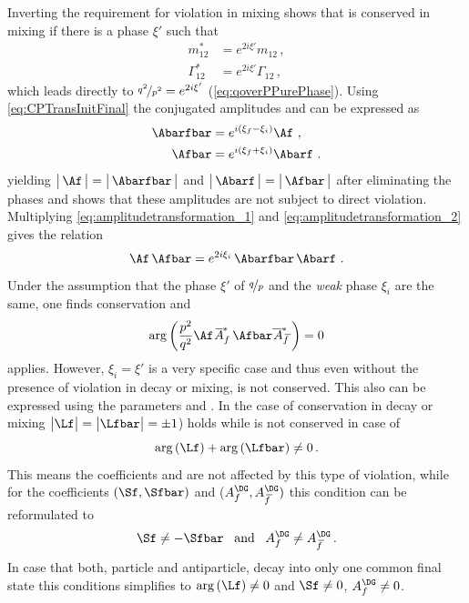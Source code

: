 Inverting the requirement for \CP violation in mixing shows that \CP is conserved in mixing if there is a phase $\xi'$ such that
\begin{equation}
\begin{split}
m_{12}^\ast &= e^{2i\xi'}m_{12}\,,\\
\Gamma_{12}^\ast &= e^{2i\xi'}\Gamma_{12}\,,\label{eq:CPconservationMixing}
\end{split}
\end{equation}
which leads directly to $\nicefrac{q^2}{p^2} = e^{2i\xi'}$ (\cref{eq:qoverPPurePhase}).
Using \cref{eq:CPTransInitFinal} the \CP conjugated amplitudes \Abarfbar and \Afbar can be expressed as
\begin{align}
\Abarfbar&=e^{i\left(\xi_f-\xi_i\right)}\Af\,\,,\label{eq:amplitudetransformation_1}\\
\Afbar&=e^{i\left(\xi_f+\xi_i\right)}\Abarf\,\,.\label{eq:amplitudetransformation_2}
\end{align}
yielding $\big|\,\Af\,\big|=\big|\,\Abarfbar\,\big|$ and $\big|\,\Abarf\,\big|=\big|\,\Afbar\,\big|$ after eliminating the phases and shows that these amplitudes are not subject to direct \CP violation.
Multiplying \cref{eq:amplitudetransformation_1} and \cref{eq:amplitudetransformation_2} gives the relation
\begin{equation}
\Af\,\Afbar=e^{2i\xi_i}\,\Abarfbar\,\Abarf\,\,.
\end{equation}
Under the assumption that the phase $\xi'$ of $\nicefrac{q}{p}$ and the \emph{weak} phase $\xi_i$ are the same, one finds \CP conservation and
\begin{equation}
\arg\left(\frac{p^2}{q^2}\Af \,\overline{\kern -1.0pt A\kern -1.0pt}_{\kern 1.0pt f}^\ast\,\Afbar\overline{\kern -1.0pt \,A\kern -1.0pt}_{\kern 2.5pt\overline{\kern -1.5pt f\kern 1.5pt}}^\ast\right)=0
\end{equation}
applies.
However, $\xi_i=\xi'$ is a very specific case and thus even without the presence of \CP violation in decay or mixing, \CP is not conserved.
This also can be expressed using the parameters \Lf and \Lfbar.
In the case of \CP conservation in decay or mixing $\big|\Lf\big|=\big|\Lfbar\big| = \pm1$) holds while \CP is not conserved in case of
\begin{equation}
	\arg\left(\Lf\right)+\arg\left(\Lfbar\right)\neq0\,. \label{eq:conditionCPV}
\end{equation}
This means the \CP coefficients \Cf and \Cfbar are not affected by this type of \CP violation, while for the coefficients $(\Sf, \Sfbar)$ and  ($A_f^{\DG}, A_{\kern 1.5pt\overline{\kern -1.5pt f\kern 1.5pt}}^{\DG})$ this condition can be reformulated to
\begin{equation}
\Sf\neq-\Sfbar\,\,\,\,\,\text{and}\,\,\,\,\,A_f^{\DG}\neq A_{\kern 1.5pt\overline{\kern -1.5pt f\kern 1.5pt}}^{\DG}\,.
\end{equation}
In case that both, particle and antiparticle, decay into only one common final state this conditions simplifies to $\arg\left(\Lf\right)\neq0$ and $\Sf\neq0$, $A_f^{\DG}\neq0$.

